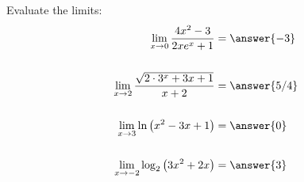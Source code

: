 \documentclass{ximera}
\author{Bobby Ramsey}
\begin{document}
\begin{exercise}

	Evaluate the limits:
	\begin{align*}
		\lim_{x\to 0} \frac{4x^2-3}{2xe^x+1} &= \answer{-3}\\
		\\
		\lim_{x \to 2} \frac{\sqrt{2\cdot 3^x+3x+1}}{x+2} &= \answer{5/4}\\
		\\
		\lim_{x\to 3} \ln\left( x^2-3x+1\right) &= \answer{0}\\
		\\
		\lim_{x \to -2} \log_{2}\left( 3x^2+2x\right) &= \answer{3}
	\end{align*}

\end{exercise}
\end{document}
